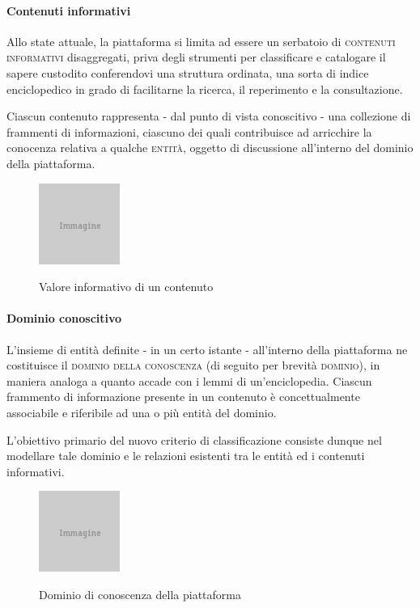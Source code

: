 \paragraph{Contenuti informativi}
Allo state attuale, la piattaforma si limita ad essere un serbatoio di \textsc{contenuti informativi} disaggregati, priva degli strumenti per classificare e catalogare il sapere custodito conferendovi una struttura ordinata, una sorta di indice enciclopedico in grado di facilitarne la ricerca, il reperimento e la consultazione.

Ciascun contenuto rappresenta - dal punto di vista conoscitivo - una collezione di frammenti di informazioni, ciascuno dei quali contribuisce ad arricchire la conocenza relativa a qualche \textsc{entità}, oggetto di discussione all'interno del dominio della piattaforma.

\begin{figure}[ht]
\begin{center}
 \includegraphics{placeholder.png}
 \label{fig:tesi:stage:fase-uno:contenuti-informativi}
 \caption{Valore informativo di un contenuto}
\end{center}
\end{figure}

\paragraph{Dominio conoscitivo}
L'insieme di entità definite - in un certo istante - all'interno della piattaforma ne costituisce il \textsc{dominio della conoscenza} (di seguito per brevità \textsc{dominio}), in maniera analoga a quanto accade con i lemmi di un'enciclopedia. Ciascun frammento di informazione presente in un contenuto è concettualmente associabile e riferibile ad una o più entità del dominio.

L'obiettivo primario del nuovo criterio di classificazione consiste dunque nel modellare tale dominio e le relazioni esistenti tra le entità ed i contenuti informativi.

\begin{figure}[ht]
\begin{center}
 \includegraphics{placeholder.png}
 \label{fig:tesi:stage:fase-uno:dominio-conoscenza}
 \caption{Dominio di conoscenza della piattaforma}
\end{center}
\end{figure}

